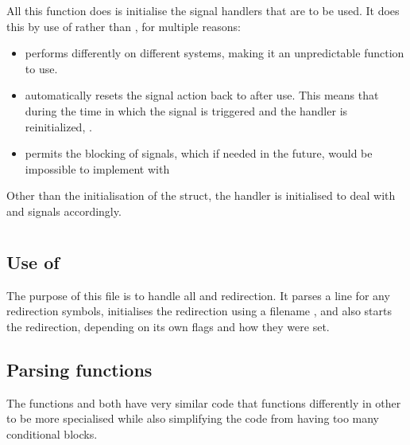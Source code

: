 \documentclass[12pt, a4paper]{report}
\begin{document}
                All this function does is initialise the signal handlers that are to be
                used. It does this by use of  rather than ,
                for multiple reasons:
                    \begin{itemize}
                        \item {} performs differently on different systems,
                            making it an unpredictable function to use.
                        \item {} automatically resets the signal action back
                            to  after use. This means that during the time
                            in which the signal is triggered and the handler is 
                            reinitialized, .
                        \item {} permits the blocking of signals, which if needed
                            in the future, would be impossible to implement with 
                    \end{itemize}
                
                    Other than the initialisation of the  struct, the
                    handler is initialised to deal with  and 
                    signals accordingly.

        \section{}
            \subsection{Use of }
                The purpose of this file is to handle all  and
                 redirection. It parses a line for any redirection
                symbols, initialises the redirection using a filename
                , and also starts the redirection,
                depending on its own flags and how they were set.
                
            \subsection{Parsing functions}
                The functions  and 
                both have very similar code that functions differently in other
                to be more specialised while also simplifying the code from having
                too many conditional blocks.
\end{document}
